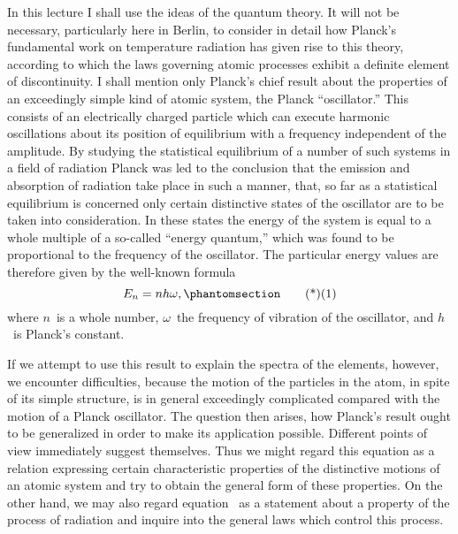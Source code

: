 In this lecture I shall use the ideas of the quantum theory. It
will not be necessary, particularly here in Berlin, to consider in
detail how Planck's fundamental work on temperature radiation
has given rise to this theory, according to which the laws governing
atomic processes exhibit a definite element of discontinuity. I shall
mention only Planck's chief result about the properties of an exceedingly
simple kind of atomic system, the Planck ``oscillator.''
This consists of an electrically charged particle which can execute
harmonic oscillations about its position of equilibrium with a frequency
independent of the amplitude. By studying the statistical
equilibrium of a number of such systems in a field of radiation
Planck was led to the conclusion that the emission and absorption
of radiation take place in such a manner, that, so far as a statistical
equilibrium is concerned only certain distinctive states of the
oscillator are to be taken into consideration. In these states the
energy of the system is equal to a whole multiple of a so-called
``energy quantum,'' which was found to be proportional to the frequency
of the oscillator. The particular energy values are therefore
given by the well-known formula
\[
E_{n} = nh\omega,
\Tag{(1)}
\]
where $n$~is a whole number, $\omega$~the frequency of vibration of the
oscillator, and $h$~is Planck's constant.

If we attempt to use this result to explain the spectra of the
elements, however, we encounter difficulties, because the motion of
the particles in the atom, in spite of its simple structure, is in general
exceedingly complicated compared with the motion of a Planck
oscillator. The question then arises, how Planck's result ought to
be generalized in order to make its application possible. Different
points of view immediately suggest themselves. Thus we might
regard this equation as a relation expressing certain characteristic
properties of the distinctive motions of an atomic system and try
to obtain the general form of these properties. On the other hand,
we may also regard equation~ as a statement about a property
of the process of radiation and inquire into the general laws which
control this process.

